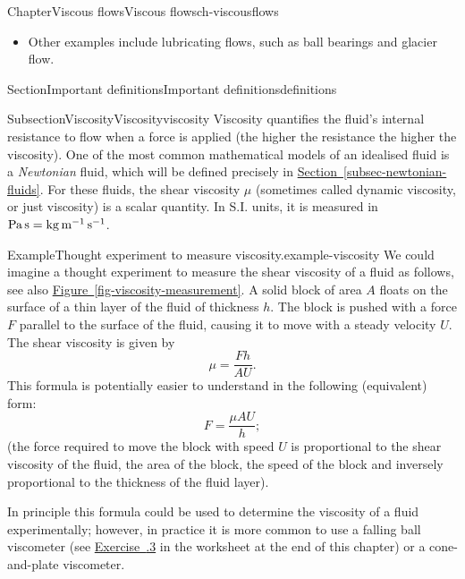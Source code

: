 \documentclass[oneside,10pt,]{book}
\newcommand{\xreffont}{\relax}
\newcommand{\ptxlistdisc}{\raisebox{0.3ex}{\textbullet}}
\numberwithin{equation}{section}
\begin{document}
\begin{chapterptx}{Chapter}{Viscous flows}{}{Viscous flows}{}{}{ch-viscousflows}
\begin{introduction}{}
\begin{itemize}[label=\ptxlistdisc]
\item{}Other examples include lubricating flows, such as ball bearings and glacier flow.%
\end{itemize}
%
\end{introduction}%
%
%
\typeout{************************************************}
\typeout{************************************************}
%
\begin{sectionptx}{Section}{Important definitions}{}{Important definitions}{}{}{definitions}
%
%
\typeout{************************************************}
\typeout{************************************************}
%
\begin{subsectionptx}{Subsection}{Viscosity}{}{Viscosity}{}{}{viscosity}
Viscosity quantifies the fluid's internal resistance to flow when a force is applied (the higher the resistance the higher the viscosity). One of the most common mathematical models of an idealised fluid is a \emph{Newtonian} fluid, which will be defined precisely in \hyperref[subsec-newtonian-fluids]{Section~{\xreffont\ref{subsec-newtonian-fluids}}}. For these fluids, the shear viscosity \(\mu\) (sometimes called dynamic viscosity, or just viscosity) is a scalar quantity. In S.I. units, it is measured in \(\textrm{Pa\,s} = \mathrm{kg\,m^{-1}\,s^{-1}}\).%
\begin{example}{Example}{Thought experiment to measure viscosity.}{example-viscosity}%
We could imagine a thought experiment to measure the shear viscosity of a fluid as follows, see also \hyperref[fig-viscosity-measurement]{Figure~{\xreffont\ref{fig-viscosity-measurement}}}. A solid block of area \(A\) floats on the surface of a thin layer of the fluid of thickness \(h\). The block is pushed with a force \(F\) parallel to the surface of the fluid, causing it to move with a steady velocity \(U\). The shear viscosity is given by%
\begin{equation*}
\mu = \frac{F h}{A U}.
\end{equation*}
This formula is potentially easier to understand in the following (equivalent) form:%
\begin{equation*}
F = \frac{\mu A U}{h};
\end{equation*}
(the force required to move the block with speed \(U\) is proportional to the shear viscosity of the fluid, the area of the block, the speed of the block and inversely proportional to the thickness of the fluid layer).%
\par
In principle this formula could be used to determine the viscosity of a fluid experimentally; however, in practice it is more common to use a falling ball viscometer (see \hyperlink{ps-falling-ball-viscometer}{Exercise~{\xreffont 6.9.3}} in the worksheet at the end of this chapter) or a cone-and-plate viscometer.%

\end{example}
\end{subsectionptx}
\end{sectionptx}
\end{chapterptx}
\end{document}
